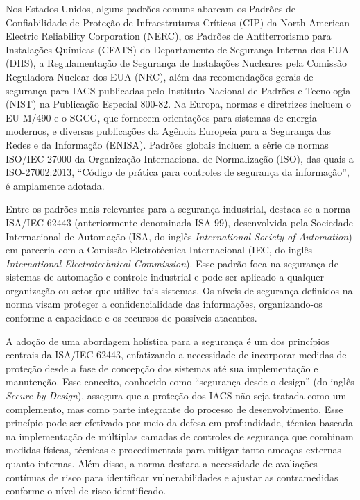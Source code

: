         \begin{citacao}
            Nos Estados Unidos, alguns padrões comuns abarcam os Padrões de Confiabilidade de Proteção de Infraestruturas Críticas (CIP) da North American Electric Reliability Corporation (NERC), os Padrões de Antiterrorismo para Instalações Químicas (CFATS) do Departamento de Segurança Interna dos EUA (DHS), a Regulamentação de Segurança de Instalações Nucleares pela Comissão Reguladora Nuclear dos EUA (NRC), além das recomendações gerais de segurança para IACS publicadas pelo Instituto Nacional de Padrões e Tecnologia (NIST) na Publicação Especial 800-82. Na Europa, normas e diretrizes incluem o EU M/490 e o SGCG, que fornecem orientações para sistemas de energia modernos, e diversas publicações da Agência Europeia para a Segurança das Redes e da Informação (ENISA). Padrões globais incluem a série de normas ISO/IEC 27000 da Organização Internacional de Normalização (ISO), das quais a ISO-27002:2013, ``Código de prática para controles de segurança da informação'', é amplamente adotada.
        \end{citacao}
        
        Entre os padrões mais relevantes para a segurança industrial, destaca-se a norma ISA/IEC 62443 (anteriormente denominada ISA 99), desenvolvida pela Sociedade Internacional de Automação (ISA, do inglês \textit{International Society of Automation}) em parceria com a Comissão Eletrotécnica Internacional (IEC, do inglês \textit{International Electrotechnical Commission}). Esse padrão foca na segurança de sistemas de automação e controle industrial e pode ser aplicado a qualquer organização ou setor que utilize tais sistemas. Os níveis de segurança definidos na norma visam proteger a confidencialidade das informações, organizando-os conforme a capacidade e os recursos de possíveis atacantes.

        A adoção de uma abordagem holística para a segurança é um dos princípios centrais da ISA/IEC 62443, enfatizando a necessidade de incorporar medidas de proteção desde a fase de concepção dos sistemas até sua implementação e manutenção. Esse conceito, conhecido como ``segurança desde o design'' (do inglês \textit{Secure by Design}), assegura que a proteção dos IACS não seja tratada como um complemento, mas como parte integrante do processo de desenvolvimento. Esse princípio pode ser efetivado por meio da defesa em profundidade, técnica baseada na implementação de múltiplas camadas de controles de segurança que combinam medidas físicas, técnicas e procedimentais para mitigar tanto ameaças externas quanto internas. Além disso, a norma destaca a necessidade de avaliações contínuas de risco para identificar vulnerabilidades e ajustar as contramedidas conforme o nível de risco identificado.

